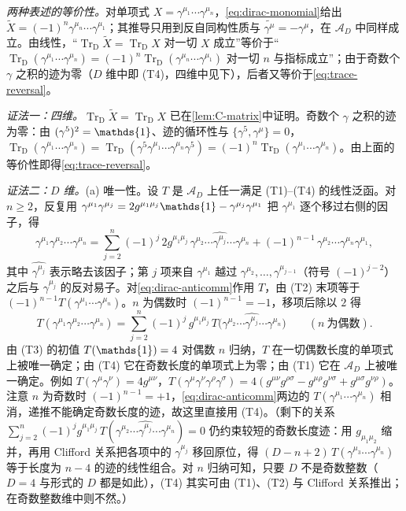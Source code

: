 \documentclass[UTF8,a4paper,11pt,fontset=fandol]{ctexart}
\makeatletter
\let\amsmathbb\mathbb
\renewcommand{\mathbb}[1]{\ifx1#1\mathds{1}\else\amsmathbb{#1}\fi}
\theoremstyle{cplain}
\theoremstyle{cdefinition}
\theoremstyle{cremark}
\renewcommand{\proofname}{证明}
\renewenvironment{proof}[1][\proofname]{\par\pushQED{\qed}\normalfont\topsep6\p@\@plus6\p@\relax
  \trivlist\item[\hskip\labelsep\itshape #1\hspace{0.5em}]\ignorespaces}{\popQED\endtrivlist\@endpefalse}
\numberwithin{equation}{section}
\newcommand{\TrD}{\operatorname{Tr}_{\mathrm{D}}}   %
\newcommand{\Cconj}[1]{\widetilde{#1}}              %
\makeatother
\begin{document}
\begin{proof}
\emph{两种表述的等价性。}对单项式 $X=\gamma^{\mu_1}\cdots\gamma^{\mu_n}$，\cref{eq:dirac-monomial}给出 $\Cconj X=(-1)^n\gamma^{\mu_n}\cdots\gamma^{\mu_1}$；其推导只用到反自同构性质与 $\Cconj{\gamma^\mu}=-\gamma^\mu$，在 $\mathcal A_D$ 中同样成立。由线性，“$\TrD\Cconj X=\TrD X$ 对一切 $X$ 成立”等价于“$\TrD(\gamma^{\mu_1}\cdots\gamma^{\mu_n})=(-1)^n\TrD(\gamma^{\mu_n}\cdots\gamma^{\mu_1})$ 对一切 $n$ 与指标成立”；由于奇数个 $\gamma$ 之积的迹为零（$D$ 维中即 (T4)，四维中见下），后者又等价于\cref{eq:trace-reversal}。

\emph{证法一：四维。}$\TrD\Cconj X=\TrD X$ 已在\cref{lem:C-matrix}中证明。奇数个 $\gamma$ 之积的迹为零：由 $(\gamma^5)^2=\mathbb 1$、迹的循环性与 $\{\gamma^5,\gamma^\mu\}=0$，$\TrD(\gamma^{\mu_1}\cdots\gamma^{\mu_n})=\TrD(\gamma^5\gamma^{\mu_1}\cdots\gamma^{\mu_n}\gamma^5)=(-1)^n\TrD(\gamma^{\mu_1}\cdots\gamma^{\mu_n})$。由上面的等价性即得\cref{eq:trace-reversal}。

\emph{证法二：$D$ 维。}(a) 唯一性。设 $T$ 是 $\mathcal A_D$ 上任一满足 (T1)--(T4) 的线性泛函。对 $n\ge2$，反复用 $\gamma^{\mu_1}\gamma^{\mu_j}=2g^{\mu_1\mu_j}\mathbb 1-\gamma^{\mu_j}\gamma^{\mu_1}$ 把 $\gamma^{\mu_1}$ 逐个移过右侧的因子，得
\begin{equation}\label{eq:dirac-anticomm}
\gamma^{\mu_1}\gamma^{\mu_2}\cdots\gamma^{\mu_n}
=\sum_{j=2}^{n}(-1)^{j}\,2g^{\mu_1\mu_j}\,\gamma^{\mu_2}\cdots\widehat{\gamma^{\mu_j}}\cdots\gamma^{\mu_n}
+(-1)^{n-1}\,\gamma^{\mu_2}\cdots\gamma^{\mu_n}\gamma^{\mu_1},
\end{equation}
其中 $\widehat{\gamma^{\mu_j}}$ 表示略去该因子；第 $j$ 项来自 $\gamma^{\mu_1}$ 越过 $\gamma^{\mu_2},\dots,\gamma^{\mu_{j-1}}$（符号 $(-1)^{j-2}$）之后与 $\gamma^{\mu_j}$ 的反对易子。对\cref{eq:dirac-anticomm}作用 $T$，由 (T2) 末项等于 $(-1)^{n-1}T(\gamma^{\mu_1}\cdots\gamma^{\mu_n})$。$n$ 为偶数时 $(-1)^{n-1}=-1$，移项后除以 $2$ 得
\begin{equation}\label{eq:dirac-recursion}
T(\gamma^{\mu_1}\gamma^{\mu_2}\cdots\gamma^{\mu_n})=\sum_{j=2}^{n}(-1)^{j}\,g^{\mu_1\mu_j}\,T\bigl(\gamma^{\mu_2}\cdots\widehat{\gamma^{\mu_j}}\cdots\gamma^{\mu_n}\bigr)\qquad(n\ \text{为偶数}).
\end{equation}
由 (T3) 的初值 $T(\mathbb 1)=4$ 对偶数 $n$ 归纳，$T$ 在一切偶数长度的单项式上被唯一确定；由 (T4) 它在奇数长度的单项式上为零；由 (T1) 它在 $\mathcal A_D$ 上被唯一确定。例如 $T(\gamma^\mu\gamma^\nu)=4g^{\mu\nu}$，$T(\gamma^\mu\gamma^\nu\gamma^\rho\gamma^\sigma)=4(g^{\mu\nu}g^{\rho\sigma}-g^{\mu\rho}g^{\nu\sigma}+g^{\mu\sigma}g^{\nu\rho})$。注意 $n$ 为奇数时 $(-1)^{n-1}=+1$，\cref{eq:dirac-anticomm}两边的 $T(\gamma^{\mu_1}\cdots\gamma^{\mu_n})$ 相消，递推不能确定奇数长度的迹，故这里直接用 (T4)。（剩下的关系 $\sum_{j=2}^{n}(-1)^{j}g^{\mu_1\mu_j}\,T(\gamma^{\mu_2}\cdots\widehat{\gamma^{\mu_j}}\cdots\gamma^{\mu_n})=0$ 仍约束较短的奇数长度迹：用 $g_{\mu_1\mu_2}$ 缩并，再用 Clifford 关系把各项中的 $\gamma^{\mu_j}$ 移回原位，得 $(D-n+2)\,T(\gamma^{\mu_3}\cdots\gamma^{\mu_n})$ 等于长度为 $n-4$ 的迹的线性组合。对 $n$ 归纳可知，只要 $D$ 不是奇数整数（$D=4$ 与形式的 $D$ 都是如此），(T4) 其实可由 (T1)、(T2) 与 Clifford 关系推出；在奇数整数维中则不然。）


\end{proof}
\end{document}
